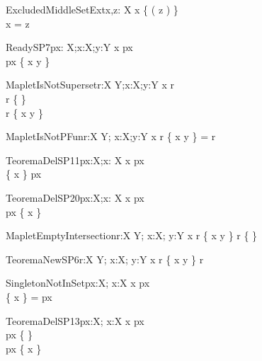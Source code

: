 \begin{theorem}{ExcludedMiddleSetExt}{x,z: X}
x \notin \{ \sw( z ) \} \\
x = z \\
\end{theorem}

\begin{theorem}{ReadySP7}{px: \power X;x:X;y:Y}
x \in px \\
px \subset \dom \{ x \mapsto y \}
\end{theorem}

\begin{theorem}{MapletIsNotSuperset}{r:X \rel Y;x:X;y:Y}
x \notin \dom r \\
r \neq \{ \} \\
r \subset \{ x \mapsto y \}
\end{theorem}

\begin{theorem}{MapletIsNotPFun}{r:X \rel Y; x:X;y:Y}
x \notin \dom r
\{ x \mapsto y \} = r
\end{theorem}

\begin{theorem}{TeoremaDelSP11}{px:\power X;x: X}
x \notin px \\
\{ x \} \subset px
\end{theorem}

\begin{theorem}{TeoremaDelSP20}{px:\power X;x: X}
x \in px \\
px \subset \{ x \}
\end{theorem}

\begin{theorem}{MapletEmptyIntersection}{r:X \rel Y; x:X; y:Y}
x \notin \dom r
\{ x \mapsto y \} \cap r \neq \{ \}
\end{theorem}

\begin{theorem}{TeoremaNewSP6}{r:X \rel Y; x:X; y:Y}
x \notin \dom r
\{ x \mapsto y \} \subset r
\end{theorem}

\begin{theorem}{SingletonNotInSet}{px:\power X; x:X}
x \notin px \\
\{ x \} = px
\end{theorem}

\begin{theorem}{TeoremaDelSP13}{px:\power X; x:X}
x \notin px \\
px \neq \{ \} \\
px \subset \{ x \}
\end{theorem}

